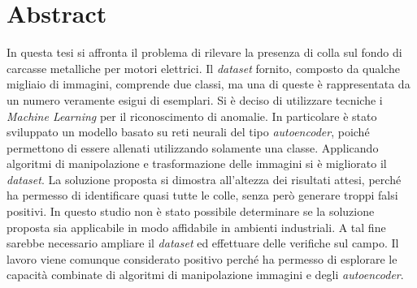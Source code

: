 \chapter{Abstract}
In questa tesi si affronta il problema di rilevare la presenza di colla sul
fondo di carcasse metalliche per motori elettrici.
Il \textit{dataset} fornito, composto da qualche migliaio di immagini, comprende due classi, ma una di queste è rappresentata da un numero veramente esigui di esemplari.
Si è deciso di utilizzare tecniche i \textit{Machine Learning} per il riconoscimento di anomalie.
In particolare è stato sviluppato un modello basato su reti neurali del tipo \textit{autoencoder}, poiché permettono di essere allenati utilizzando solamente una classe.
Applicando algoritmi di manipolazione e trasformazione delle immagini si è migliorato il \textit{dataset}.
La soluzione proposta si dimostra all'altezza dei risultati attesi, perché ha permesso di identificare quasi tutte le colle, senza però generare troppi falsi positivi.
In questo studio non è stato possibile determinare se la soluzione proposta sia applicabile in modo affidabile in ambienti industriali.
A tal fine sarebbe necessario ampliare il \textit{dataset} ed effettuare delle verifiche sul campo.
Il lavoro viene comunque considerato positivo perché ha permesso di esplorare le capacità combinate di algoritmi di manipolazione immagini e degli \textit{autoencoder}.


